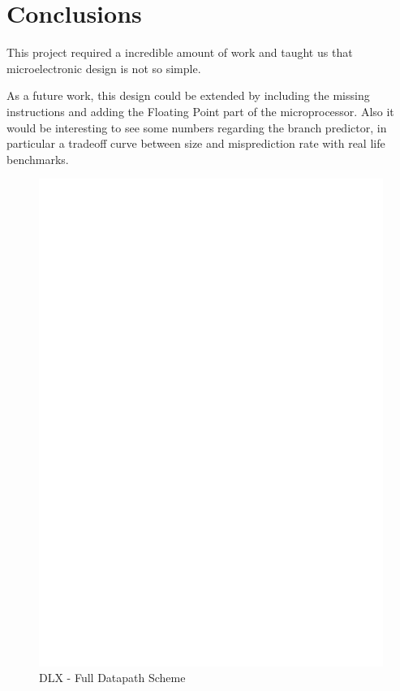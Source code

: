 \documentclass[12pt]{article}
\begin{document}
\section{Conclusions}\label{Conclusions}
This project required a incredible amount of work and taught us that microelectronic design is not so simple.

As a future work, this design could be extended by including the missing instructions and adding the Floating Point part of the microprocessor. 
Also it would be interesting to see some numbers regarding the branch predictor, in particular a tradeoff curve between size and misprediction rate with real life benchmarks.


\printbibliography

\begin{landscape}
	\begin{figure}[!ht]
		\includegraphics[height=1\textheight,center]{images/SCHEME_DLX_FW.eps}
		\caption{DLX - Full Datapath Scheme}
		\label{PPA}
	\end{figure}
	\end{landscape}
\end{document}
